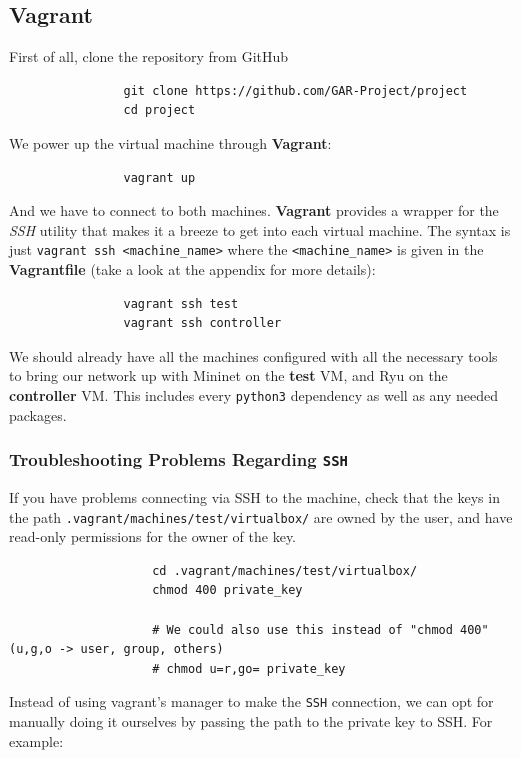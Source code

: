 \documentclass[12pt]{report}
\begin{document}
		\subsection{Vagrant}
			First of all, clone the repository from GitHub  

			\begin{verbatim}
				git clone https://github.com/GAR-Project/project
				cd project
			\end{verbatim}

			We power up the virtual machine through \textbf{Vagrant}:

			\begin{verbatim}
				vagrant up
			\end{verbatim}

			And we have to connect to both machines. \textbf{Vagrant} provides a wrapper for the \textit{SSH} utility that makes it a breeze to get into each virtual machine. The syntax is just \texttt{vagrant ssh <machine\_name>} where the \texttt{<machine\_name>} is given in the \textbf{Vagrantfile} (take a look at the appendix for more details):

			\begin{verbatim}
				vagrant ssh test
				vagrant ssh controller
			\end{verbatim}

			We should already have all the machines configured with all the necessary tools to bring our network up with Mininet on the \textbf{test} VM, and Ryu on the \textbf{controller} VM. This includes every \texttt{python3} dependency as well as any needed packages.

			\subsubsection{Troubleshooting Problems Regarding \texttt{SSH}}
				If you have problems connecting via SSH to the machine, check that the keys in the path \texttt{.vagrant/machines/test/virtualbox/} are owned by the user, and have read-only permissions for the owner of the key. 

				\begin{verbatim}
					cd .vagrant/machines/test/virtualbox/
					chmod 400 private_key

					# We could also use this instead of "chmod 400" (u,g,o -> user, group, others)
					# chmod u=r,go= private_key
				\end{verbatim}

				Instead of using vagrant's manager to make the \texttt{SSH} connection, we can opt for manually doing it ourselves by passing the path to the private key to SSH. For example:
\end{document}
